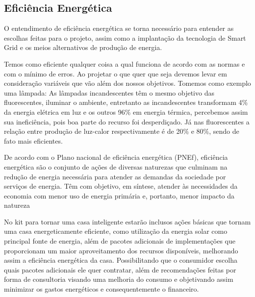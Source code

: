 \subsection{Eficiência Energética}
\par O entendimento de eficiência energética se torna necessário para entender as escolhas feitas para o projeto, assim como a implantação da tecnologia de Smart Grid e os meios alternativos de produção de energia.
\par Temos como eficiente qualquer coisa a qual funciona de acordo com as normas e com o mínimo de erros. Ao projetar o que quer que seja devemos levar em consideração variáveis que vão além dos nossos objetivos. Tomemos como exemplo uma lâmpada: As lâmpadas incandescentes têm o mesmo objetivo das fluorescentes, iluminar o ambiente, entretanto as incandescentes transformam 4\% da energia elétrica em luz e os outros 96\% em energia térmica, percebemos assim sua ineficiência, pois boa parte do recurso foi desperdiçado. Já nas fluorescentes a relação entre produção de luz-calor respectivamente é de 20\% e 80\%, sendo de fato mais eficientes.
\par De acordo com o Plano nacional de eficiência energética (PNEf), eficiência energética são o conjunto de ações de diversas naturezas que culminam na redução de energia necessária para atender as demandas da sociedade por serviços de energia. Têm com objetivo, em síntese, atender às necessidades da economia com menor uso de energia primária e, portanto, menor impacto da natureza
\par No kit para tornar uma casa inteligente estarão inclusos ações básicas que tornam uma casa energeticamente eficiente, como utilização da energia solar como principal fonte de energia, além de pacotes adicionais de implementações que proporcionam um maior aproveitamento dos recursos disponíveis, melhorando assim a eficiência energética da casa. Possibilitando que o consumidor escolha quais pacotes adicionais ele quer contratar, além de recomendações feitas por forma de consultoria visando uma melhoria do consumo e objetivando assim minimizar os gastos energéticos e consequentemente o financeiro.

